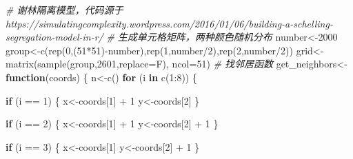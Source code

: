 \documentclass[]{tufte-book}
\newenvironment{Shaded}{}{}
\newcommand{\AttributeTok}[1]{\textcolor[rgb]{0.49,0.56,0.16}{#1}}
\newcommand{\CommentTok}[1]{\textcolor[rgb]{0.38,0.63,0.69}{\textit{#1}}}
\newcommand{\ControlFlowTok}[1]{\textcolor[rgb]{0.00,0.44,0.13}{\textbf{#1}}}
\newcommand{\DecValTok}[1]{\textcolor[rgb]{0.25,0.63,0.44}{#1}}
\newcommand{\FunctionTok}[1]{\textcolor[rgb]{0.02,0.16,0.49}{#1}}
\newcommand{\NormalTok}[1]{#1}
\newcommand{\OtherTok}[1]{\textcolor[rgb]{0.00,0.44,0.13}{#1}}
\newcommand{\SpecialCharTok}[1]{\textcolor[rgb]{0.25,0.44,0.63}{#1}}
\begin{document}
\begin{Shaded}
\begin{Highlighting}[]
\CommentTok{\# 谢林隔离模型，代码源于 https://simulatingcomplexity.wordpress.com/2016/01/06/building{-}a{-}schelling{-}segregation{-}model{-}in{-}r/}
\CommentTok{\# 生成单元格矩阵，两种颜色随机分布}
\NormalTok{number}\OtherTok{\textless{}{-}}\DecValTok{2000}
\NormalTok{group}\OtherTok{\textless{}{-}}\FunctionTok{c}\NormalTok{(}\FunctionTok{rep}\NormalTok{(}\DecValTok{0}\NormalTok{,(}\DecValTok{51}\SpecialCharTok{*}\DecValTok{51}\NormalTok{)}\SpecialCharTok{{-}}\NormalTok{number),}\FunctionTok{rep}\NormalTok{(}\DecValTok{1}\NormalTok{,number}\SpecialCharTok{/}\DecValTok{2}\NormalTok{),}\FunctionTok{rep}\NormalTok{(}\DecValTok{2}\NormalTok{,number}\SpecialCharTok{/}\DecValTok{2}\NormalTok{))}
\NormalTok{grid}\OtherTok{\textless{}{-}}\FunctionTok{matrix}\NormalTok{(}\FunctionTok{sample}\NormalTok{(group,}\DecValTok{2601}\NormalTok{,}\AttributeTok{replace=}\NormalTok{F), }\AttributeTok{ncol=}\DecValTok{51}\NormalTok{)}
\CommentTok{\# 找邻居函数}
\NormalTok{get\_neighbors}\OtherTok{\textless{}{-}}\ControlFlowTok{function}\NormalTok{(coords) \{}
\NormalTok{        n}\OtherTok{\textless{}{-}}\FunctionTok{c}\NormalTok{()}
        \ControlFlowTok{for}\NormalTok{ (i }\ControlFlowTok{in} \FunctionTok{c}\NormalTok{(}\DecValTok{1}\SpecialCharTok{:}\DecValTok{8}\NormalTok{)) \{}
                
                \ControlFlowTok{if}\NormalTok{ (i }\SpecialCharTok{==} \DecValTok{1}\NormalTok{) \{}
\NormalTok{                        x}\OtherTok{\textless{}{-}}\NormalTok{coords[}\DecValTok{1}\NormalTok{] }\SpecialCharTok{+} \DecValTok{1}
\NormalTok{                        y}\OtherTok{\textless{}{-}}\NormalTok{coords[}\DecValTok{2}\NormalTok{]}
\NormalTok{                \}}
                
                \ControlFlowTok{if}\NormalTok{ (i }\SpecialCharTok{==} \DecValTok{2}\NormalTok{) \{}
\NormalTok{                        x}\OtherTok{\textless{}{-}}\NormalTok{coords[}\DecValTok{1}\NormalTok{] }\SpecialCharTok{+} \DecValTok{1}
\NormalTok{                        y}\OtherTok{\textless{}{-}}\NormalTok{coords[}\DecValTok{2}\NormalTok{] }\SpecialCharTok{+} \DecValTok{1}
\NormalTok{                \}}
                
                \ControlFlowTok{if}\NormalTok{ (i }\SpecialCharTok{==} \DecValTok{3}\NormalTok{) \{}
\NormalTok{                        x}\OtherTok{\textless{}{-}}\NormalTok{coords[}\DecValTok{1}\NormalTok{]}
\NormalTok{                        y}\OtherTok{\textless{}{-}}\NormalTok{coords[}\DecValTok{2}\NormalTok{] }\SpecialCharTok{+} \DecValTok{1}
\NormalTok{                \}}
                

\end{Highlighting}
\end{Shaded}
\end{document}
